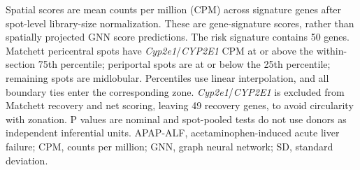Spatial scores are mean counts per million (CPM) across signature genes after spot-level library-size normalization. These are gene-signature scores, rather than spatially projected GNN score predictions. The risk signature contains 50 genes. Matchett pericentral spots have \textit{Cyp2e1}/\allowbreak{}\textit{CYP2E1} CPM at or above the within-section 75th percentile; periportal spots are at or below the 25th percentile; remaining spots are midlobular. Percentiles use linear interpolation, and all boundary ties enter the corresponding zone. \textit{Cyp2e1}/\allowbreak{}\textit{CYP2E1} is excluded from Matchett recovery and net scoring, leaving 49 recovery genes, to avoid circularity with zonation. P values are nominal and spot-pooled tests do not use donors as independent inferential units. APAP-ALF, acetaminophen-induced acute liver failure; CPM, counts per million; GNN, graph neural network; SD, standard deviation.
